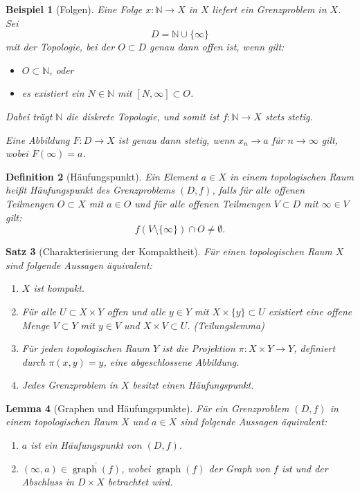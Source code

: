 \documentclass[a4paper,12pt]{article}
\theoremstyle{break}
\newtheorem{definition}{Definition}[section]
\newtheorem{theorem}[definition]{Satz}
\newtheorem{example}[definition]{Beispiel}
\newtheorem{lemma}[definition]{Lemma}
\begin{document}
\begin{example}[Folgen]
Eine Folge $x: \mathbb{N} \to X$ in $X$ liefert ein Grenzproblem in $X$. Sei 
\[
D = \mathbb{N} \cup \{\infty\}
\]
mit der Topologie, bei der $O \subset D$ genau dann offen ist, wenn gilt:
\begin{itemize}
    \item $O \subset \mathbb{N}$, oder
    \item es existiert ein $N \in \mathbb{N}$ mit $[N, \infty] \subset O$.
\end{itemize}
Dabei trägt $\mathbb{N}$ die diskrete Topologie, und somit ist $f: \mathbb{N} \to X$ stets stetig.

Eine Abbildung $F: D \to X$ ist genau dann stetig, wenn $x_n \to a$ für $n \to \infty$ gilt, wobei $F(\infty) = a$.
\end{example}

\begin{definition}[Häufungspunkt]
Ein Element $a \in X$ in einem topologischen Raum heißt \emph{Häufungspunkt} des Grenzproblems $(D, f)$, falls für alle offenen Teilmengen $O \subset X$ mit $a \in O$ und für alle offenen Teilmengen $V \subset D$ mit $\infty \in V$ gilt:
\[
f(V \setminus \{\infty\}) \cap O \neq \emptyset.
\]
\end{definition}

\begin{theorem}[Charakterisierung der Kompaktheit]
Für einen topologischen Raum $X$ sind folgende Aussagen äquivalent:
\begin{enumerate}
    \item $X$ ist kompakt.
    \item Für alle $U \subset X \times Y$ offen und alle $y \in Y$ mit $X \times \{y\} \subset U$ existiert eine offene Menge $V \subset Y$ mit $y \in V$ und $X \times V \subset U$. (Teilungslemma)
    \item Für jeden topologischen Raum $Y$ ist die Projektion $\pi: X \times Y \to Y$, definiert durch $\pi(x,y) = y$, eine abgeschlossene Abbildung.
    \item Jedes Grenzproblem in $X$ besitzt einen Häufungspunkt.
\end{enumerate}
\end{theorem}

\begin{lemma}[Graphen und Häufungspunkte]
Für ein Grenzproblem $(D, f)$ in einem topologischen Raum $X$ und $a \in X$ sind folgende Aussagen äquivalent:
\begin{enumerate}
    \item $a$ ist ein Häufungspunkt von $(D, f)$.
    \item $(\infty, a) \in \overline{\operatorname{graph}(f)}$, wobei $\operatorname{graph}(f)$ der Graph von $f$ ist und der Abschluss in $D \times X$ betrachtet wird.
\end{enumerate}
\end{lemma}
\end{document}
